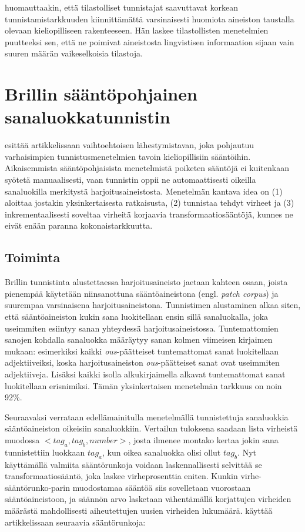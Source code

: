 \documentclass[utf8,bachelor,manualbib]{gradu3}
\begin{document}
\citet{brill1992} huomauttaakin, että tilastolliset tunnistajat saavuttavat korkean tunnistamistarkkuuden kiinnittämättä varsinaisesti huomiota aineiston taustalla olevaan kieliopilliseen rakenteeseen. Hän laskee tilastollisten menetelmien puutteeksi sen, että ne poimivat aineistosta lingvistisen informaation sijaan vain suuren määrän vaikeselkoisia tilastoja.

\section{Brillin sääntöpohjainen sanaluokkatunnistin}

\citet{brill1992} esittää artikkelissaan vaihtoehtoisen lähestymistavan, joka pohjautuu varhaisimpien tunnistusmenetelmien tavoin kieliopillisiin sääntöihin. Aikaisemmista sääntöpohjaisista menetelmistä poiketen sääntöjä ei kuitenkaan syötetä manuaalisesti, vaan tunnistin oppii ne automaattisesti oikeilla sanaluokilla merkitystä harjoitusaineistosta. Menetelmän kantava idea on (1) aloittaa jostakin yksinkertaisesta ratkaisusta, (2) tunnistaa tehdyt virheet ja (3) inkrementaalisesti soveltaa virheitä korjaavia transformaatiosääntöjä, kunnes ne eivät enään paranna kokonaistarkkuutta.

\subsection{Toiminta}

Brillin tunnistinta alustettaessa harjoitusaineisto jaetaan kahteen osaan, joista pienempää käytetään niinsanottuna sääntöaineistona (engl. \textit{patch corpus}) ja suurempaa varsinaisena harjoitusaineistona. Tunnistimen alustaminen alkaa siten, että sääntöaineiston kukin sana luokitellaan ensin sillä sanaluokalla, joka useimmiten esiintyy sanan yhteydessä harjoitusaineistossa. Tuntemattomien sanojen kohdalla sanaluokka määräytyy sanan kolmen viimeisen kirjaimen mukaan: esimerkiksi kaikki \textit{ous}-päätteiset tuntemattomat sanat luokitellaan adjektiiveiksi, koska harjoitusaineiston \textit{ous}-päätteiset sanat ovat useimmiten adjektiiveja. Lisäksi kaikki isolla alkukirjaimella alkavat tuntemattomat sanat luokitellaan erisnimiksi. Tämän yksinkertaisen menetelmän tarkkuus on noin 92\%. \citep{brill1992}

Seuraavaksi verrataan edellämainitulla menetelmällä tunnistettuja sanaluokkia sääntöaineiston oikeisiin sanaluokkiin. Vertailun tuloksena saadaan lista virheistä muodossa $<tag_a, tag_b, number>$, josta ilmenee montako kertaa jokin sana tunnistettiin luokkaan $tag_a$, kun oikea sanaluokka olisi ollut $tag_b$. Nyt käyttämällä valmiita sääntörunkoja voidaan laskennallisesti selvittää se transformaatiosääntö, joka laskee virheprosenttia eniten. Kunkin virhe-sääntörunko-parin muodostamaa sääntöä siis sovelletaan vuorostaan sääntöaineistoon, ja säännön arvo lasketaan vähentämällä korjattujen virheiden määrästä mahdollisesti aiheutettujen uusien virheiden lukumäärä. \citet{brill1992} käyttää artikkelissaan seuraavia sääntörunkoja:
\end{document}

